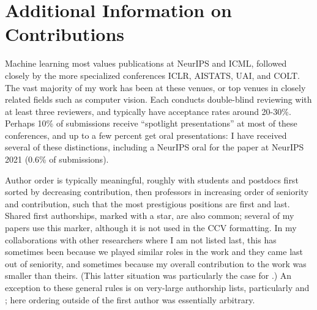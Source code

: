 \documentclass[12pt]{article}
\newcommand{\bibeqcon}{{\footnotemark[1]}}
\begin{document}
\clearpage
\section{Additional Information on Contributions}
\renewcommand{\bibeqcon}{{\footnotemark[1]}}
\renewcommand{\thefootnote}{\fnsymbol{footnote}}  %
Machine learning most values publications at NeurIPS and ICML, followed closely by the more specialized conferences ICLR, AISTATS, UAI, and COLT. The vast majority of my work has been at these venues, or top venues in closely related fields such as computer vision. Each conducts double-blind reviewing with at least three reviewers, and typically have acceptance rates around 20-30\%.
Perhaps 10\% of submissions receive ``spotlight presentations'' at most of these conferences, and up to a few percent get oral presentations: I have received several of these distinctions, including a NeurIPS oral for the paper \cite{koehler:gaussian-interpolators} at NeurIPS 2021 (0.6\% of submissions).

Author order is typically meaningful,
roughly with students and postdocs first sorted by decreasing contribution,
then professors in increasing order of seniority and contribution,
such that the most prestigious positions are first and last.
Shared first authorships, marked with a star, are also common;
several of my papers use this marker, although it is not used in the CCV formatting.
In my collaborations with other researchers where I am not listed last,
this has sometimes been because we played similar roles in the work and they came last out of seniority,
and sometimes because my overall contribution to the work was smaller than theirs.
(This latter situation was particularly the case for
\cite{seo:contrastive-wsod}.)
An exception to these general rules is on very-large authorship lists,
particularly \cite{flamary:pot} and \cite{queerinai:qai};
here ordering outside of the first author was essentially arbitrary.

\end{document}
